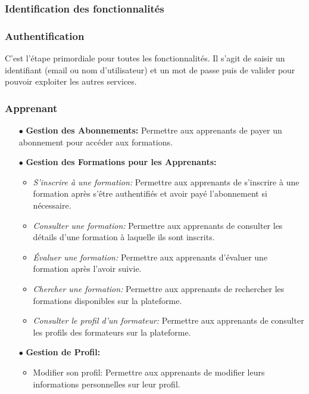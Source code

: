 \subsubsection{Identification des fonctionnalités}

\subsubsection*{Authentification}

C’est l’étape primordiale pour toutes les fonctionnalités. Il s’agit de saisir un identifiant (email ou nom d'utilisateur) et un mot de passe puis de valider pour pouvoir exploiter les autres services.

\subsubsection*{Apprenant}
\begin{itemize}
    \item[$\bullet$] \textbf{Gestion des Abonnements:} Permettre aux apprenants de payer un abonnement pour accéder aux formations.
    \item[$\bullet$] \textbf{Gestion des Formations pour les Apprenants:}
    \begin{itemize}
        \item \textit{S'inscrire à une formation:} Permettre aux apprenants de s'inscrire à une formation après s'être authentifiés et avoir payé l'abonnement si nécessaire.
        \item \textit{ Consulter une formation:} Permettre aux apprenants de consulter les détails d'une formation à laquelle ils sont inscrits.
        \item \textit{Évaluer une formation:} Permettre aux apprenants d'évaluer une formation après l'avoir suivie.
        \item \textit{ Chercher une formation:} Permettre aux apprenants de rechercher les formations disponibles sur la plateforme.
        \item \textit{Consulter le profil d'un formateur:} Permettre aux apprenants de consulter les profils des formateurs sur la plateforme.
    \end{itemize}
    \item[$\bullet$] \textbf{Gestion de Profil:}
    \begin{itemize}
        \item  Modifier son profil: Permettre aux apprenants de modifier leurs informations personnelles sur leur profil.
    \end{itemize}
\end{itemize}
    
